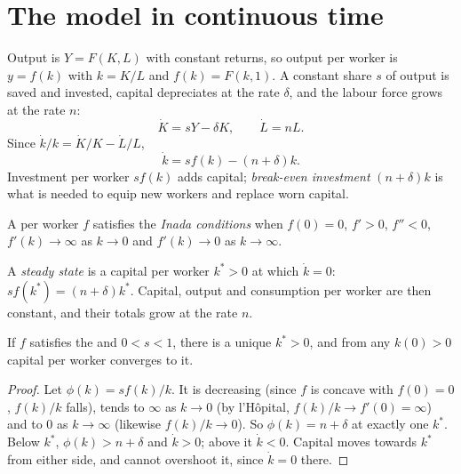 \section{The model in continuous time}\label{sec:b1:solow-model:continuous}

Output is $Y = F(K, L)$ with constant returns, so output per worker is
$y = f(k)$ with $k = K/L$ and $f(k) = F(k, 1)$. A constant share $s$ of output is
saved and invested, capital depreciates at the rate $\delta$, and the labour force
grows at the rate $n$:
\[
\dot K = sY - \delta K, \qquad \dot L = nL.
\]
Since $\dot k/k = \dot K/K - \dot L/L$,
\[
\dot k = s f(k) - (n + \delta)k.
\]
Investment per worker $sf(k)$ adds capital; \emph{break-even investment}
$(n + \delta)k$ is what is needed to equip new workers and replace worn
capital.

\begin{definition}\label{def:b1:solow-model:inada}
A  per worker $f$ satisfies the \emph{Inada conditions}
when $f(0) = 0$, $f' > 0$, $f'' < 0$, $f'(k) \to \infty$ as $k \to 0$ and $f'(k) \to 0$ as $k \to \infty$.
\end{definition}

\begin{definition}\label{def:b1:solow-model:steady-state}
A \emph{steady state} is a capital per worker $k^* > 0$ at which $\dot k = 0$:
$sf(k^*) = (n + \delta)k^*$. Capital, output and consumption per worker are then
constant, and their totals grow at the rate $n$.
\end{definition}

\begin{proposition}\label{prop:b1:solow-model:stability}
If $f$ satisfies the  and $0 < s < 1$, there is a unique  $k^* > 0$, and from any $k(0) > 0$ capital per worker converges to it.
\end{proposition}

\begin{proof}
Let $\phi(k) = sf(k)/k$. It is decreasing (since $f$ is concave with $f(0) = 0$, $f(k)/k$
falls), tends to $\infty$ as $k \to 0$ (by l'Hôpital, $f(k)/k \to f'(0) = \infty$) and to $0$ as $k \to \infty$
(likewise $f(k)/k \to 0$). So $\phi(k) = n + \delta$ at exactly one $k^*$. Below $k^*$, $\phi(k) > n + \delta$
and $\dot k > 0$; above it $\dot k < 0$. Capital moves towards $k^*$ from either side,
and cannot overshoot it, since $\dot k = 0$ there.
\end{proof}

